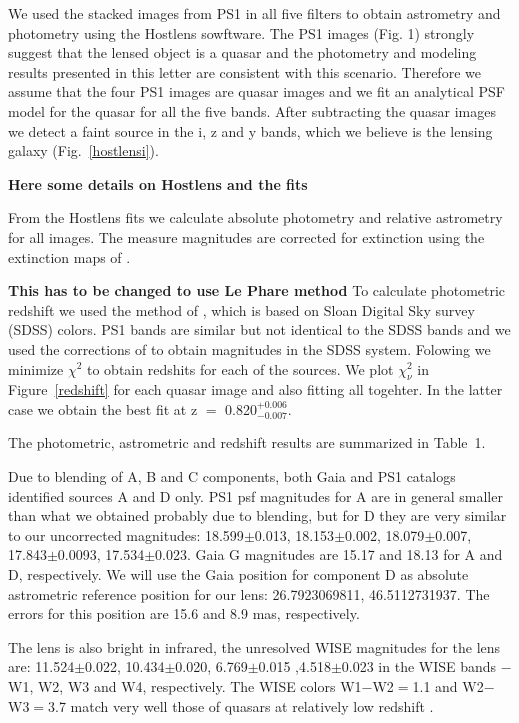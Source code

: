 \documentclass[manuscript]{aastex}
\begin{document}
We used the stacked images from PS1 in all five filters to obtain astrometry and photometry using the Hostlens sowftware.
The PS1 images (Fig. 1) strongly suggest that the lensed object is a quasar and the photometry and modeling results presented in this letter are consistent with this scenario. Therefore we assume that the four PS1 images are quasar images and we fit an analytical PSF model for the quasar for all the five bands. After subtracting the quasar images we detect a faint source in the i, z and y bands, which we believe is the lensing galaxy (Fig.~\ref{hostlensi}).

{\bf Here some details on Hostlens and the fits}

From the Hostlens fits we calculate absolute photometry and relative astrometry for all images. The measure magnitudes are corrected for extinction using the extinction maps of \citet{sch11}.

{\bf This has to be changed to use Le Phare method }
To calculate photometric redshift we used the method of \citet{wu10}, which is based on Sloan Digital Sky survey (SDSS) colors. PS1 bands are similar but not identical to the SDSS bands and we used the corrections of \citep{fin16} to obtain magnitudes in the SDSS system. Folowing \citet{wu10} we minimize ${\chi}^2$ to obtain redshits for each of the sources. We plot $\chi^2_{\nu}$ in Figure~\ref{redshift} for each quasar image and also fitting all togehter. In the latter case we obtain the best fit at z $=$ 0.820$^{+0.006}_{-0.007}$.

The photometric, astrometric and redshift results are summarized in Table~1. 

Due to blending of A, B and C components, both Gaia \citep{gaia} and PS1 catalogs identified sources A and D only. 
PS1 psf magnitudes for A are in general smaller than what we obtained probably due to blending, but for D they are very similar to our uncorrected magnitudes: 18.599$\pm$0.013,  18.153$\pm$0.002,  18.079$\pm$0.007,  17.843$\pm$0.0093,  17.534$\pm$0.023. Gaia G magnitudes are 15.17 and 18.13 for A and D, respectively.
We will use the Gaia position for component D as absolute astrometric reference position for our lens: 26.7923069811, 46.5112731937. The errors for this position are 15.6 and 8.9 mas, respectively.

The lens is also bright in infrared, the unresolved WISE magnitudes for the lens are: 11.524$\pm$0.022, 10.434$\pm$0.020, 6.769$\pm$0.015 ,4.518$\pm$0.023  in the WISE bands $-$ W1, W2, W3 and W4, respectively. The WISE colors W1$-$W2$=$1.1 and W2$-$W3$=$3.7 match very well those of quasars at relatively low redshift \citep[e.g.][]{wu12}.
\end{document}
